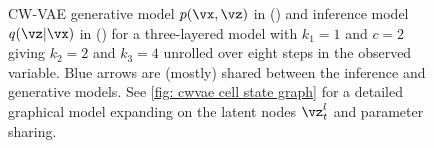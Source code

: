 \begin{figure}[t!]
\begin{subfigure}[b]{\textwidth}
{\begin{tikzpicture}
    \end{tikzpicture}
    \hspace{2cm}
    }
    \caption{}
    \label{fig: cwvae three-layered graphical model inference}
    \end{subfigure}
\caption{
    CW-VAE \cite{saxena_clockwork_2021} generative model $p(\vx,\vz)$ in () and inference model $q(\vz|\vx)$ in () for a three-layered model with $k_1=1$ and $c=2$ giving $k_2=2$ and $k_3=4$ unrolled over eight steps in the observed variable. Blue arrows are (mostly) shared between the inference and generative models. See \cref{fig: cwvae cell state graph} for a detailed graphical model expanding on the latent nodes $\vz^l_t$ and parameter sharing.
}
\label{fig: cwvae three-layered graphical models (inference and generative)}
\end{figure}



